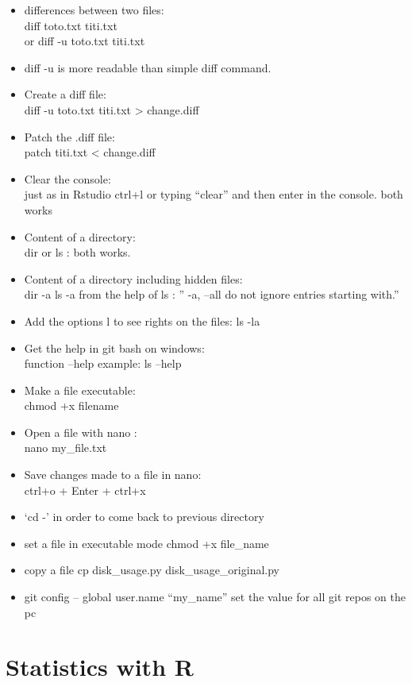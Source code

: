 \documentclass[
]{book}
\begin{document}
\begin{itemize}
\item
  differences between two files:\\
  diff toto.txt titi.txt\\
  or diff -u toto.txt titi.txt
\item
  diff -u is more readable than simple diff command.
\item
  Create a diff file:\\
  diff -u toto.txt titi.txt \textgreater{} change.diff
\item
  Patch the .diff file:\\
  patch titi.txt \textless{} change.diff
\item
  Clear the console:\\
  just as in Rstudio ctrl+l
  or typing ``clear'' and then enter in the console.
  both works
\item
  Content of a directory:\\
  dir or ls : both works.
\item
  Content of a directory including hidden files:\\
  dir -a
  ls -a
  from the help of ls : '' -a, --all do not ignore entries starting with.''
\item
  Add the options l to see rights on the files:
  ls -la
\item
  Get the help in git bash on windows:\\
  function --help
  example: ls --help
\item
  Make a file executable:\\
  chmod +x filename
\item
  Open a file with nano :\\
  nano my\_file.txt
\item
  Save changes made to a file in nano:\\
  ctrl+o + Enter + ctrl+x
\item
  `cd -' in order to come back to previous directory
\item
  set a file in executable mode
  chmod +x file\_name
\item
  copy a file
  cp disk\_usage.py disk\_usage\_original.py
\item
  git config -- global user.name ``my\_name''
  set the value for all git repos on the pc
\end{itemize}

\hypertarget{statistics-with-r}{%
\chapter{Statistics with R}\label{statistics-with-r}}
\end{document}

